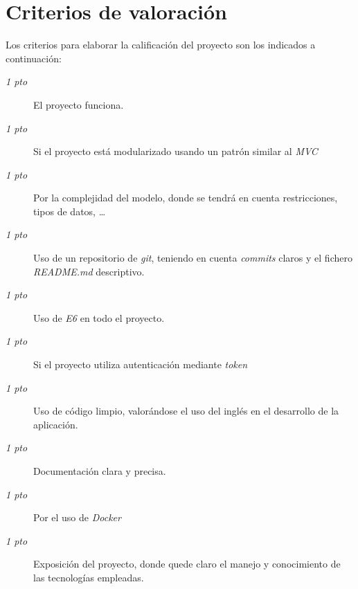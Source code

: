 \documentclass{article}
\begin{document}
\section{Criterios de valoración}
Los criterios para elaborar la calificación del proyecto son los indicados a continuación:
\begin{description}
\item[\emph{1 pto}] El proyecto funciona.
\item[\emph{1 pto}] Si el proyecto está modularizado usando un patrón similar al \emph{MVC}
\item[\emph{1 pto}] Por la complejidad del modelo, donde se tendrá en cuenta restricciones, tipos de datos, \dots
\item[\emph{1 pto}] Uso de un repositorio de \emph{git}, teniendo en cuenta \emph{commits} claros y el fichero \emph{README.md} descriptivo.
\item[\emph{1 pto}] Uso de \emph{E6} en todo el proyecto.
\item[\emph{1 pto}] Si el proyecto utiliza autenticación mediante \emph{token}
\item[\emph{1 pto}] Uso de código limpio, valorándose el uso del inglés en el desarrollo de la aplicación.
\item[\emph{1 pto}] Documentación clara y precisa.
\item[\emph{1 pto}] Por el uso de \emph{Docker}
\item[\emph{1 pto}] Exposición del proyecto, donde quede claro el manejo y conocimiento de las tecnologías empleadas.

\end{description}
\end{document}
